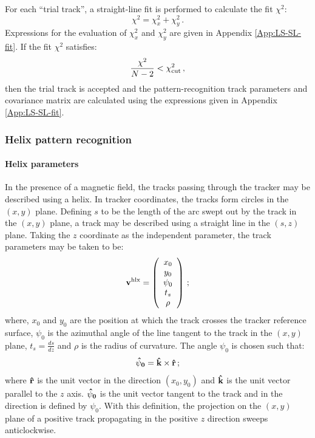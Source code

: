 For each ``trial track'', a straight-line fit is performed to
calculate the fit $\chi^2$:
\begin{equation}
  \chi^2 = \chi_x^2 + \chi_y^2 \,.
\end{equation}
Expressions for the evaluation of $\chi^2_x$ and $\chi^2_y$ are given
in Appendix \ref{App:LS-SL-fit}.
If the fit $\chi^2$ satisfies:
\begin{equation}
  \frac{\chi^2}{N-2} < \chi^2_{\rm cut} \,,
\end{equation}
then the trial track is accepted and the pattern-recognition track
parameters and covariance matrix are calculated using the expressions
given in Appendix \ref{App:LS-SL-fit}.

\subsubsection{Helix pattern recognition}
\label{SubSect:SLPatRec}

\paragraph{Helix parameters}

In the presence of a magnetic field, the tracks passing through the
tracker may be described using a helix.
In tracker coordinates, the tracks form circles in the $(x, y)$
plane.
Defining $s$ to be the length of the arc swept out by the track in the
$(x, y)$ plane, a track may be described using a straight line in the
$(s, z)$ plane.
Taking the $z$ coordinate as the independent parameter, the track
parameters may be taken to be:
\begin{equation}
 {\bf v^{\rm hlx}} =
 \left( 
   \begin{array}{c}
     x_0    \\
     y_0    \\
     \psi_0 \\
     t_s    \\
     \rho
   \end{array}
   \right)\,;
\end{equation}
where, $x_0$ and $y_0$ are the position at which the track crosses the
tracker reference surface, $\psi_0$ is the azimuthal angle of the line
tangent to the track in the $(x, y)$ plane, $t_s = \frac{ds}{dz}$ and 
$\rho$ is the radius of curvature. 
The angle $\psi_0$ is chosen such that:
\begin{equation}
  {\bf \hat{\psi}_0} = {\bf \hat{k}} \times {\bf \hat{r}} \, ;
\end{equation}
where ${\bf \hat{r}}$ is the unit vector in the direction $(x_0, y_0)$
and ${\bf \hat{k}}$ is the unit vector parallel to the $z$ axis.
${\bf \hat{\psi}_0}$ is the unit vector tangent to the track and in
the direction is defined by $\psi_0$.
With this definition, the projection on the $(x, y)$ plane of a
positive track propagating in the positive $z$ direction sweeps
anticlockwise.

